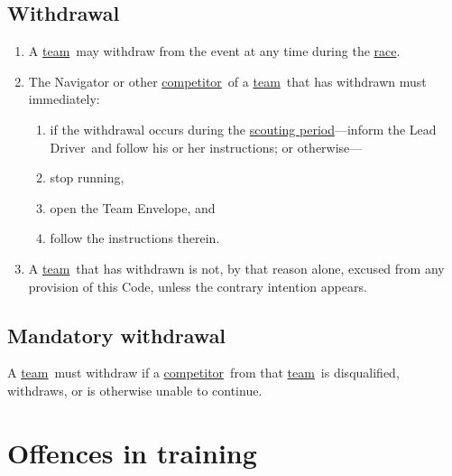 \documentclass[12pt]{report}
\newcommand{\hyplink}[1]{\hyperlink{#1}{{#1}}}
\newcommand{\competitor}{\hyplink{competitor}}
\newcommand{\LeadDriver}{Lead Driver}
\newcommand{\race}{\hyplink{race}}
\newcommand{\scoutingperiod}{\hyplink{scouting period}}
\newcommand{\team}{\hyplink{team}}
\newcommand{\TeamEnvelope}{Team Envelope}
\begin{document}
  \section{Withdrawal}
  \begin{enumerate}
    \item A \team\ may withdraw from the event at any time during the \race.
    \item The Navigator or other \competitor\ of a \team\ that has withdrawn must immediately:
    \begin{enumerate}
    \item if the withdrawal occurs during the \scoutingperiod---inform the \LeadDriver\ and follow his or her instructions;  or otherwise---
        \item stop running,
      \item open the \TeamEnvelope, and
      \item follow the instructions therein.
    \end{enumerate}
    \item A \team\ that has withdrawn is not, by that reason alone, excused from any provision of this Code, unless the contrary intention appears.
  \end{enumerate}
  \section{Mandatory withdrawal}
  \begin{fenumerate}
    \item A \team\ must withdraw if a \competitor\ from that \team\ is disqualified, withdraws, or is otherwise unable to continue.
\end{fenumerate}
\chapter{Offences in training}
\end{document}
